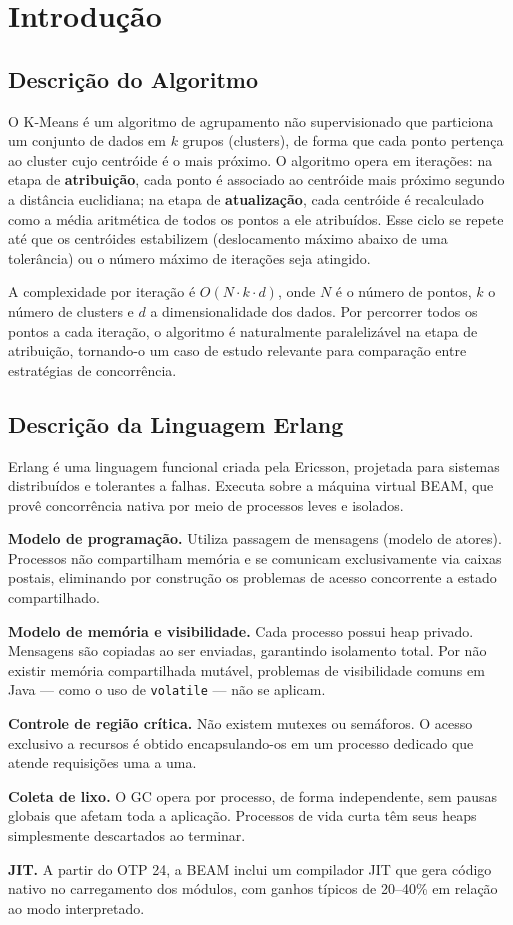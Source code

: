 \section{Introdução}

\subsection{Descrição do Algoritmo}

O K-Means é um algoritmo de agrupamento não supervisionado que particiona um
conjunto de dados em \(k\) grupos (clusters), de forma que cada ponto pertença
ao cluster cujo centróide é o mais próximo. O algoritmo opera em iterações:
na etapa de \textbf{atribuição}, cada ponto é associado ao centróide mais próximo
segundo a distância euclidiana; na etapa de \textbf{atualização}, cada centróide
é recalculado como a média aritmética de todos os pontos a ele atribuídos. Esse
ciclo se repete até que os centróides estabilizem (deslocamento máximo abaixo de
uma tolerância) ou o número máximo de iterações seja atingido.

A complexidade por iteração é \(O(N \cdot k \cdot d)\), onde \(N\) é o número de
pontos, \(k\) o número de clusters e \(d\) a dimensionalidade dos dados. Por
percorrer todos os pontos a cada iteração, o algoritmo é naturalmente paralelizável
na etapa de atribuição, tornando-o um caso de estudo relevante para comparação
entre estratégias de concorrência.

\subsection{Descrição da Linguagem Erlang}

Erlang é uma linguagem funcional criada pela Ericsson, projetada para sistemas distribuídos e
tolerantes a falhas. Executa sobre a máquina virtual BEAM, que provê concorrência nativa por
meio de processos leves e isolados.

\textbf{Modelo de programação.}
Utiliza passagem de mensagens (modelo de atores). Processos não compartilham memória e se
comunicam exclusivamente via caixas postais, eliminando por construção os problemas de acesso
concorrente a estado compartilhado.

\textbf{Modelo de memória e visibilidade.}
Cada processo possui heap privado. Mensagens são copiadas ao ser enviadas, garantindo
isolamento total. Por não existir memória compartilhada mutável, problemas de visibilidade
comuns em Java — como o uso de \texttt{volatile} — não se aplicam.

\textbf{Controle de região crítica.}
Não existem mutexes ou semáforos. O acesso exclusivo a recursos é obtido encapsulando-os
em um processo dedicado que atende requisições uma a uma.

\textbf{Coleta de lixo.}
O GC opera por processo, de forma independente, sem pausas globais que afetam toda a
aplicação. Processos de vida curta têm seus heaps simplesmente descartados ao terminar.

\textbf{JIT.}
A partir do OTP 24, a BEAM inclui um compilador JIT que gera código nativo no
carregamento dos módulos, com ganhos típicos de 20--40\% em relação ao modo interpretado.
